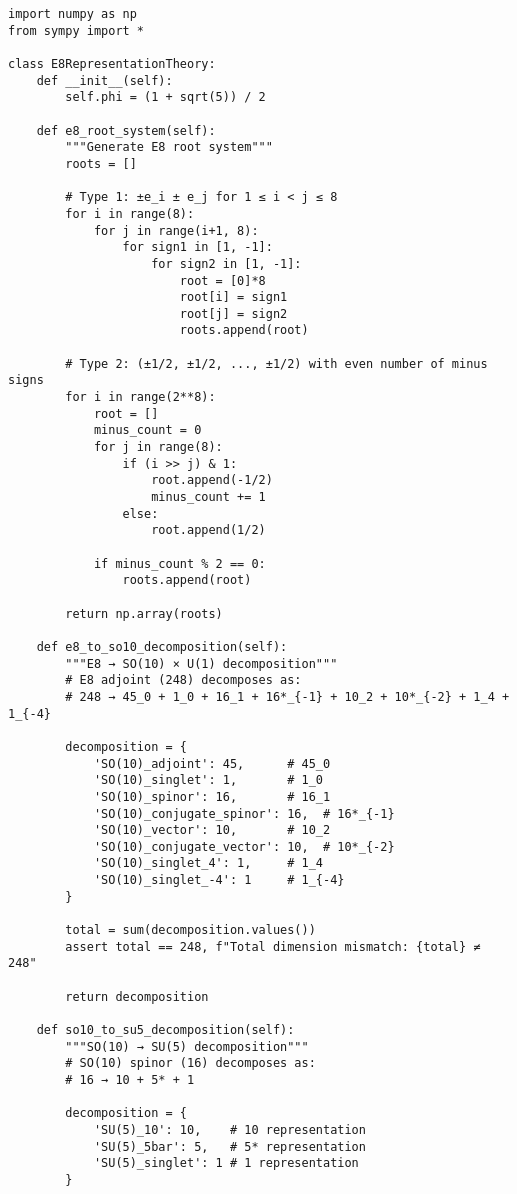 \documentclass[11pt]{article}
\theoremstyle{definition}
\begin{document}
\begin{verbatim}
import numpy as np
from sympy import *

class E8RepresentationTheory:
    def __init__(self):
        self.phi = (1 + sqrt(5)) / 2
        
    def e8_root_system(self):
        """Generate E8 root system"""
        roots = []
        
        # Type 1: ±e_i ± e_j for 1 ≤ i < j ≤ 8
        for i in range(8):
            for j in range(i+1, 8):
                for sign1 in [1, -1]:
                    for sign2 in [1, -1]:
                        root = [0]*8
                        root[i] = sign1
                        root[j] = sign2
                        roots.append(root)
        
        # Type 2: (±1/2, ±1/2, ..., ±1/2) with even number of minus signs
        for i in range(2**8):
            root = []
            minus_count = 0
            for j in range(8):
                if (i >> j) & 1:
                    root.append(-1/2)
                    minus_count += 1
                else:
                    root.append(1/2)
            
            if minus_count % 2 == 0:
                roots.append(root)
        
        return np.array(roots)
    
    def e8_to_so10_decomposition(self):
        """E8 → SO(10) × U(1) decomposition"""
        # E8 adjoint (248) decomposes as:
        # 248 → 45_0 + 1_0 + 16_1 + 16*_{-1} + 10_2 + 10*_{-2} + 1_4 + 1_{-4}
        
        decomposition = {
            'SO(10)_adjoint': 45,      # 45_0
            'SO(10)_singlet': 1,       # 1_0
            'SO(10)_spinor': 16,       # 16_1
            'SO(10)_conjugate_spinor': 16,  # 16*_{-1}
            'SO(10)_vector': 10,       # 10_2
            'SO(10)_conjugate_vector': 10,  # 10*_{-2}
            'SO(10)_singlet_4': 1,     # 1_4
            'SO(10)_singlet_-4': 1     # 1_{-4}
        }
        
        total = sum(decomposition.values())
        assert total == 248, f"Total dimension mismatch: {total} ≠ 248"
        
        return decomposition
    
    def so10_to_su5_decomposition(self):
        """SO(10) → SU(5) decomposition"""
        # SO(10) spinor (16) decomposes as:
        # 16 → 10 + 5* + 1
        
        decomposition = {
            'SU(5)_10': 10,    # 10 representation
            'SU(5)_5bar': 5,   # 5* representation
            'SU(5)_singlet': 1 # 1 representation
        }
        

\end{verbatim}
\end{document}
